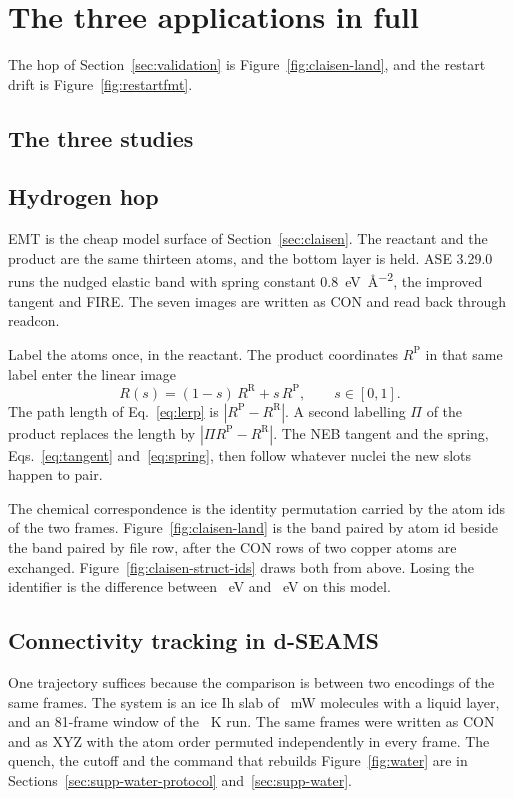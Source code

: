 \section{The three applications in full}\label{sec:supp-applications}
The hop of Section~\ref{sec:validation} is Figure~\ref{fig:claisen-land}, and the restart drift is Figure~\ref{fig:restartfmt}.
\subsection{The three studies}
\subsection{Hydrogen hop}
EMT is the cheap model surface of Section~\ref{sec:claisen}.
The reactant and the product are the same thirteen atoms, and the bottom layer is held.
ASE 3.29.0 runs the nudged elastic band with spring constant \SI{0.8}{\electronvolt\per\angstrom\squared}, the improved tangent and FIRE.
The seven images are written as CON and read back through readcon.

Label the atoms once, in the reactant.
The product coordinates \(R^{\mathrm{P}}\) in that same label enter the linear image
\begin{equation}
\label{eq:lerp}
R(s)=(1-s)\,R^{\mathrm{R}}+s\,R^{\mathrm{P}},\qquad s\in[0,1].
\end{equation}
The path length of Eq.~\eqref{eq:lerp} is \(|R^{\mathrm{P}}-R^{\mathrm{R}}|\).
A second labelling \(\Pi\) of the product replaces the length by \(|\Pi R^{\mathrm{P}}-R^{\mathrm{R}}|\).
The NEB tangent and the spring, Eqs.~\eqref{eq:tangent} and~\eqref{eq:spring}, then follow whatever nuclei the new slots happen to pair.

The chemical correspondence is the identity permutation carried by the atom ids of the two frames.
Figure~\ref{fig:claisen-land} is the band paired by atom id beside the band paired by file row, after the CON rows of two copper atoms are exchanged.
Figure~\ref{fig:claisen-struct-ids} draws both from above.
Losing the identifier is the difference between \hopBarrier~eV and \hopSwapped~eV on this model.




\subsection{Connectivity tracking in d-SEAMS}
One trajectory suffices because the comparison is between two encodings of the same frames.
The system is an ice Ih slab of \mwMolecules\ mW molecules with a liquid layer, and an 81-frame window of the \mwHoldK~K run.
The same frames were written as CON and as XYZ with the atom order permuted independently in every frame.
The quench, the cutoff and the command that rebuilds Figure~\ref{fig:water} are in Sections~\ref{sec:supp-water-protocol} and~\ref{sec:supp-water}.

